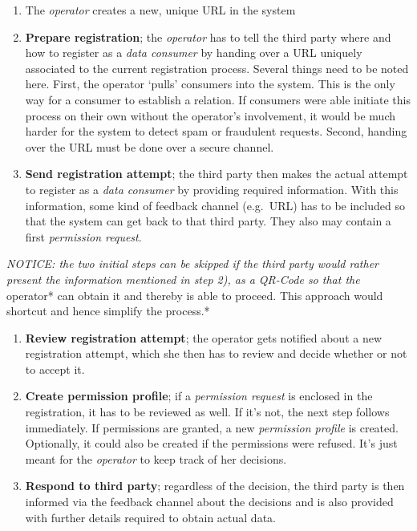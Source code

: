 \documentclass[12pt,english,a4paper,titlepage,cleardoublepage=empty,dottedtoc]{report}
\begin{document}
\begin{enumerate}
\def\labelenumi{\arabic{enumi})}
\setcounter{enumi}{-1}
\item
  The \emph{operator} creates a new, unique URL in the system
\item
  \textbf{Prepare registration}; the \emph{operator} has to tell the
  third party where and how to register as a \emph{data consumer} by
  handing over a URL uniquely associated to the current registration
  process. Several things need to be noted here. First, the operator
  `pulls' consumers into the system. This is the only way for a consumer
  to establish a relation. If consumers were able initiate this process
  on their own without the operator's involvement, it would be much
  harder for the system to detect spam or fraudulent requests. Second,
  handing over the URL must be done over a secure channel.
\item
  \textbf{Send registration attempt}; the third party then makes the
  actual attempt to register as a \emph{data consumer} by providing
  required information. With this information, some kind of feedback
  channel (e.g.~URL) has to be included so that the system can get back
  to that third party. They also may contain a first \emph{permission
  request}.
\end{enumerate}

\emph{NOTICE: the two initial steps can be skipped if the third party
would rather present the information mentioned in step 2), as a QR-Code
so that the }operator* can obtain it and thereby is able to proceed.
This approach would shortcut and hence simplify the process.*

\begin{enumerate}
\def\labelenumi{\arabic{enumi})}
\setcounter{enumi}{2}
\item
  \textbf{Review registration attempt}; the operator gets notified about
  a new registration attempt, which she then has to review and decide
  whether or not to accept it.
\item
  \textbf{Create permission profile}; if a \emph{permission request} is
  enclosed in the registration, it has to be reviewed as well. If it's
  not, the next step follows immediately. If permissions are granted, a
  new \emph{permission profile} is created. Optionally, it could also be
  created if the permissions were refused. It's just meant for the
  \emph{operator} to keep track of her decisions.
\item
  \textbf{Respond to third party}; regardless of the decision, the third
  party is then informed via the feedback channel about the decisions
  and is also provided with further details required to obtain actual
  data.
\end{enumerate}
\end{document}
